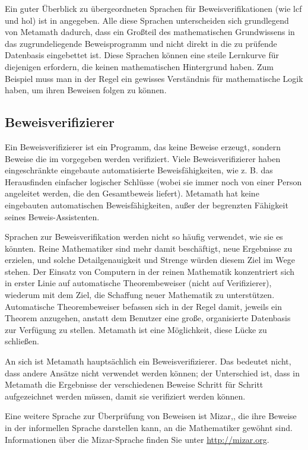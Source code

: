 Ein guter Überblick zu übergeordneten Sprachen für Beweisverifikationen (wie {\sc lcf} und {\sc hol}) ist in \cite{Harrison} angegeben.  Alle diese Sprachen unterscheiden sich grundlegend von Metamath dadurch, dass ein Großteil des mathematischen Grundwissens in das zugrundeliegende Beweisprogramm und nicht direkt in die zu prüfende Datenbasis eingebettet ist.
Diese Sprachen können eine steile Lernkurve für diejenigen erfordern, die keinen mathematischen Hintergrund haben.  Zum Beispiel muss man in der Regel ein gewisses Verständnis für mathematische Logik haben, um ihren Beweisen folgen zu können.

\subsection{Beweisverifizierer}\label{proofverifiers}

Ein Beweisverifizierer ist ein Programm, das keine Beweise erzeugt, sondern Beweise die im vorgegeben werden verifiziert.  Viele Beweisverifizierer haben eingeschränkte eingebaute automatisierte Beweisfähigkeiten, wie z. B. das Herausfinden einfacher logischer Schlüsse (wobei sie immer noch von einer Person angeleitet werden, die den Gesamtbeweis liefert).  Metamath hat keine eingebauten automatischen Beweisfähigkeiten, außer der begrenzten Fähigkeit seines Beweis-Assistenten.

Sprachen zur Beweisverifikation werden nicht so häufig verwendet, wie sie es könnten.
Reine Mathematiker sind mehr damit beschäftigt, neue Ergebnisse zu erzielen, und solche Detailgenauigkeit und Strenge würden diesem Ziel im Wege stehen.
Der Einsatz von Computern in der reinen Mathematik konzentriert sich in erster Linie auf automatische Theorembeweiser (nicht auf Verifizierer), wiederum mit dem Ziel, die Schaffung neuer Mathematik zu unterstützen.
Automatische Theorembeweiser befassen sich in der Regel damit, jeweils ein Theorem anzugehen, anstatt dem Benutzer eine große, organisierte Datenbasis zur Verfügung zu stellen.  Metamath ist eine Möglichkeit, diese Lücke zu schließen.

An sich ist Metamath hauptsächlich ein Beweisverifizierer.
Das bedeutet nicht, dass andere Ansätze nicht verwendet werden können; der Unterschied ist, dass in Metamath die Ergebnisse der verschiedenen Beweise Schritt für Schritt aufgezeichnet werden müssen, damit sie verifiziert werden können.

Eine weitere Sprache zur Überprüfung von Beweisen ist Mizar,, die ihre Beweise in der informellen Sprache darstellen kann, an die Mathematiker gewöhnt sind. Informationen über die Mizar-Sprache finden Sie unter \url{http://mizar.org}.

